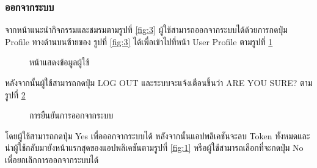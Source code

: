 \documentclass[14pt,oneside,openright,a4paper]{cpe-thai-project}
\begin{document}
\subsubsection{ออกจากระบบ}
จากหน้าแนะนำกิจกรรมและชมรมตามรูปที่ \ref{fig:3} ผู้ใช้สามารถออกจากระบบได้ด้วยการกดปุ่ม Profile ทางด้านบนซ้ายของ รูปที่ \ref{fig:3} ได้เพื่อเข้าไปที่หน้า User Profile ตามรูปที่  \ref{fig:19}
\begin{figure}[H]\centering
  \setlength{\fboxrule}{0.5mm}
  \setlength{\fboxsep}{0.5cm}
  \caption{หน้าแสดงข้อมูลผู้ใช้}\label{fig:19}
\end{figure}
หลังจากนั้นผู้ใช้สามารถกดปุ่ม LOG OUT และระบบจะแจ้งเตือนขึ้นว่า ARE YOU SURE? ตามรูปที่  \ref{fig:20}
\begin{figure}[H]\centering
  \setlength{\fboxrule}{0.5mm}
  \setlength{\fboxsep}{0.5cm}
  \caption{การยืนยันการออกจากระบบ}\label{fig:20}
\end{figure}
โดยผู้ใช้สามารถกดปุ่ม Yes เพื่อออกจากระบบได้ หลังจากนั้นแอปพลิเคชันจะลบ Token ทั้งหมดและนำผู้ใช้กลับมายังหน้าแรกสุดของแอปพลิเคชันตามรูปที่ \ref{fig:1} หรือผู้ใช้สามารถเลือกที่จะกดปุ่ม No เพื่อยกเลิกการออกจากระบบได้
\end{document}
